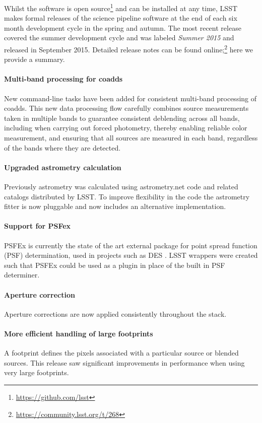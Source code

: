\documentclass[11pt,twoside]{article}
\begin{document}
Whilst the software is open
source\footnote{\url{https://github.com/lsst}} and can be installed at
any time, LSST makes formal releases of the science pipeline software
at the end of each six month development cycle in the spring and
autumn. The most recent release covered the summer development cycle
and was labeled \emph{Summer 2015} and released in September
2015. Detailed release notes can be found
online;\footnote{\url{https://community.lsst.org/t/268}} here we
provide a summary.

\paragraph{Multi-band processing for coadds} New command-line tasks
have been added for consistent multi-band processing of coadds. This
new data processing flow carefully combines source measurements taken
in multiple bands to guarantee consistent deblending across all bands,
including when carrying out forced photometry, thereby enabling
reliable color measurement, and ensuring that all sources are
measured in each band, regardless of the bands where they are detected.

\paragraph{Upgraded astrometry calculation} Previously astrometry was
calculated using astrometry.net code \citep{2010AJ....139.1782L} and
related catalogs distributed by LSST. To improve flexibility in the
code the astrometry fitter is now pluggable and now includes an
alternative implementation.

\paragraph{Support for PSFex} PSFEx is currently the state of the art
external package for point spread function (PSF) determination, used
in projects such as DES \citep{2011ASPC..442..435B}. LSST wrappers
were created such that PSFEx could be used as a plugin in place of the
built in PSF determiner.

\paragraph{Aperture correction} Aperture corrections are now applied
consistently throughout the stack.

\paragraph{More efficient handling of large footprints} A footprint
defines the pixels associated with a particular source or blended
sources. This release saw significant improvements in performance when
using very large footprints.
\end{document}
